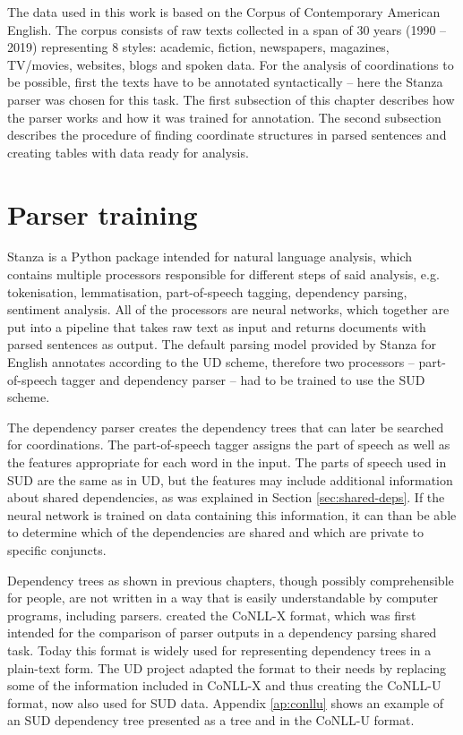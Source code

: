 The data used in this work is based on the Corpus of Contemporary American English. The corpus consists of raw texts collected in a span of 30 years (1990 -- 2019) representing 8 styles: academic, fiction, newspapers, magazines, TV/movies, websites, blogs and spoken data. For the analysis of coordinations to be possible, first the texts have to be annotated syntactically -- here the Stanza parser \citep{qi2020stanza} was chosen for this task. The first subsection of this chapter describes how the parser works and how it was trained for annotation. The second subsection describes the procedure of finding coordinate structures in parsed sentences and creating tables with data ready for analysis. 

\section{Parser training}
Stanza is a Python package intended for natural language analysis, which contains multiple processors responsible for different steps of said analysis, e.g. tokenisation, lemmatisation, part-of-speech tagging, dependency parsing, sentiment analysis. All of the processors are neural networks, which together are put into a pipeline that takes raw text as input and returns documents with parsed sentences as output. The default parsing model provided by Stanza for English annotates according to the UD scheme, therefore two processors -- part-of-speech tagger and dependency parser -- had to be trained to use the SUD scheme.

The dependency parser creates the dependency trees that can later be searched for coordinations. The part-of-speech tagger assigns the part of speech as well as the features appropriate for each word in the input. The parts of speech used in SUD are the same as in UD, but the features may include additional information about shared dependencies, as was explained in Section \ref{sec:shared-deps}. If the neural network is trained on data containing this information, it can than be able to determine which of the dependencies are shared and which are private to specific conjuncts. 

Dependency trees as shown in previous chapters, though possibly comprehensible for people, are not written in a way that is easily understandable by computer programs, including parsers. \cite{buchholz-marsi-2006-conll} created the CoNLL-X format, which was first intended for the comparison of parser outputs in a dependency parsing shared task. Today this format is widely used for representing dependency trees in a plain-text form. The UD project adapted the format to their needs by replacing some of the information included in CoNLL-X and thus creating the CoNLL-U format, now also used for SUD data. Appendix \ref{ap:conllu} shows an example of an SUD dependency tree presented as a tree and in the CoNLL-U format.

